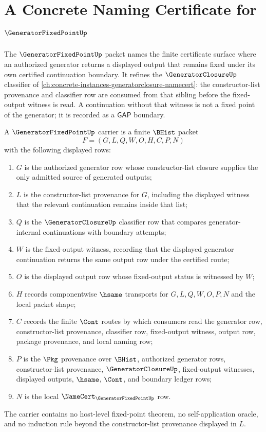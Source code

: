 \chapter{A Concrete Naming Certificate for $\GeneratorFixedPointUp$}
\label{ch:concrete-instances-generatorfixedpoint-namecert}

The $\GeneratorFixedPointUp$ packet names the finite certificate surface where an authorized generator returns a displayed output that remains fixed under its own certified continuation boundary. It refines the $\GeneratorClosureUp$ classifier of \autoref{ch:concrete-instances-generatorclosure-namecert}: the constructor-list provenance and classifier row are consumed from that sibling before the fixed-output witness is read. A continuation without that witness is not a fixed point of the generator; it is recorded as a $\mathsf{GAP}$ boundary.

\begin{definition}
\label{def:generator-fixed-point-carrier}
A $\GeneratorFixedPointUp$ carrier is a finite $\BHist$ packet
$$
F=(G,L,Q,W,O,H,C,P,N)
$$
with the following displayed rows:
\begin{enumerate}
\item $G$ is the authorized generator row whose constructor-list closure supplies the only admitted source of generated outputs;
\item $L$ is the constructor-list provenance for $G$, including the displayed witness that the relevant continuation remains inside that list;
\item $Q$ is the $\GeneratorClosureUp$ classifier row that compares generator-internal continuations with boundary attempts;
\item $W$ is the fixed-output witness, recording that the displayed generator continuation returns the same output row under the certified route;
\item $O$ is the displayed output row whose fixed-output status is witnessed by $W$;
\item $H$ records componentwise $\hsame$ transports for $G,L,Q,W,O,P,N$ and the local packet shape;
\item $C$ records the finite $\Cont$ routes by which consumers read the generator row, constructor-list provenance, classifier row, fixed-output witness, output row, package provenance, and local naming row;
\item $P$ is the $\Pkg$ provenance over $\BHist$, authorized generator rows, constructor-list provenance, $\GeneratorClosureUp$, fixed-output witnesses, displayed outputs, $\hsame$, $\Cont$, and boundary ledger rows;
\item $N$ is the local $\NameCert_{\GeneratorFixedPointUp}$ row.
\end{enumerate}
The carrier contains no host-level fixed-point theorem, no self-application oracle, and no induction rule beyond the constructor-list provenance displayed in $L$.
\end{definition}

